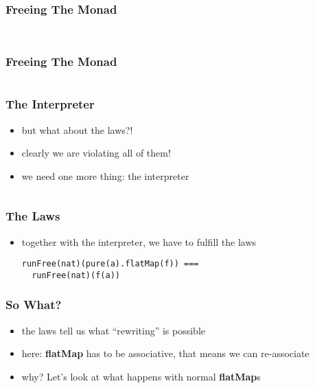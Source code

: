 \documentclass{beamer}
\begin{document}
\begin{frame}[fragile]
  \frametitle{Freeing The Monad}
  \begin{center}
    \inputminted{scala}{snippets/monad-typeclass.scala}
    \vspace{1cm}
    \inputminted{scala}{snippets/free-monad.scala}
  \end{center}
\end{frame}

\begin{frame}[fragile]
  \frametitle{Freeing The Monad}
  \begin{center}
    \inputminted{scala}{snippets/free-instance.scala}
  \end{center}
\end{frame}

\begin{frame}[fragile]
  \frametitle{The Interpreter}
  \begin{itemize}
  \item but what about the laws?!
  \item clearly we are violating all of them!
  \item we need one more thing: the interpreter
  \end{itemize}
  \inputminted{scala}{snippets/free-interp.scala}
\end{frame}

\begin{frame}[fragile]
  \frametitle{The Laws}
  \begin{itemize}
  \item together with the interpreter, we have to fulfill the laws
    \begin{verbatim}
runFree(nat)(pure(a).flatMap(f)) ===
  runFree(nat)(f(a))
    \end{verbatim}
  \end{itemize}
\end{frame}

\begin{frame}
  \frametitle{So What?}
  \begin{itemize}
  \item the laws tell us what ``rewriting'' is possible
  \item here: \textbf{flatMap} has to be associative, that means we can re-associate
  \item why? Let's look at what happens with normal \textbf{flatMap}s
  \end{itemize}
\end{frame}
\end{document}
